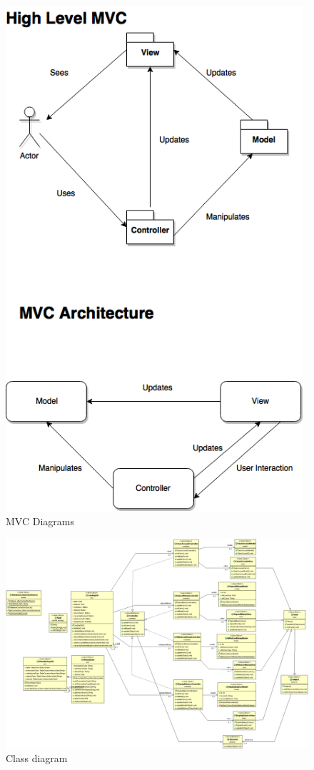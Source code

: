 \documentclass[12pt]{article}
\begin{document}
\begin{figure}[h!]
  \centering
  \includegraphics[width=110mm]{MVC.png}
  \caption{MVC Diagrams}
\end{figure}

\begin{landscape}
\begin{figure}[h!]
  \centering
  \includegraphics[width=250mm]{class_diagram.png}
  \caption{Class diagram}
\end{figure}
\end{landscape}
\end{document}

